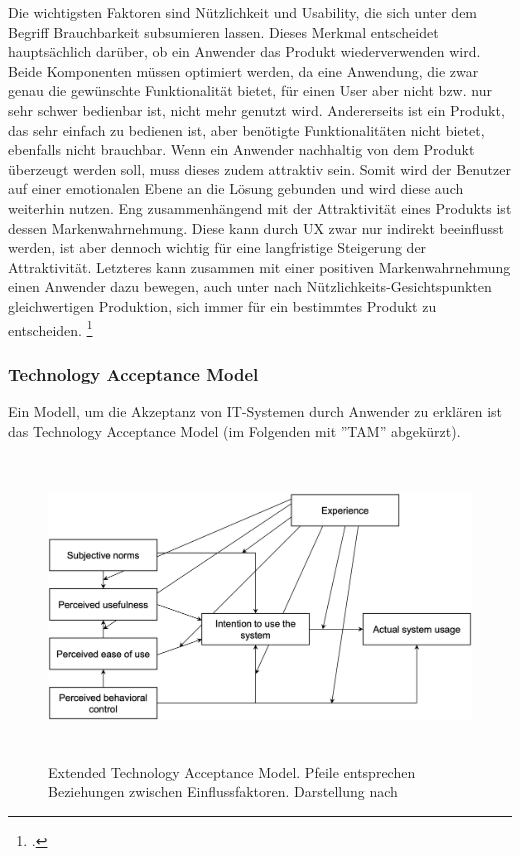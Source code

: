Die wichtigsten Faktoren sind Nützlichkeit und Usability, die sich unter dem Begriff Brauchbarkeit subsumieren lassen. Dieses Merkmal entscheidet hauptsächlich darüber, ob ein Anwender das Produkt wiederverwenden wird. Beide Komponenten müssen optimiert werden, da eine Anwendung, die zwar genau die gewünschte Funktionalität bietet, für einen User aber nicht bzw. nur sehr schwer bedienbar ist, nicht mehr genutzt wird. Andererseits ist ein Produkt, das sehr einfach zu bedienen ist, aber benötigte Funktionalitäten nicht bietet, ebenfalls nicht brauchbar. Wenn ein Anwender nachhaltig von dem Produkt überzeugt werden soll, muss dieses zudem attraktiv sein. Somit wird der Benutzer auf einer emotionalen Ebene an die Lösung gebunden und wird diese auch weiterhin nutzen. Eng zusammenhängend mit der Attraktivität eines Produkts ist dessen Markenwahrnehmung. Diese kann durch UX zwar nur indirekt beeinflusst werden, ist aber dennoch wichtig für eine langfristige Steigerung der Attraktivität. Letzteres kann zusammen mit einer positiven Markenwahrnehmung einen Anwender dazu bewegen, auch unter nach Nützlichkeits-Gesichtspunkten gleichwertigen Produktion, sich immer für ein bestimmtes Produkt zu entscheiden. \footcite[Vgl.][S. 51f]{theorie_beyer_user_experience_mit_sap_2020}

\subsubsection{Technology Acceptance Model}

Ein Modell, um die Akzeptanz von IT-Systemen durch Anwender zu erklären ist das Technology Acceptance Model (im Folgenden mit ''TAM'' abgekürzt).

\begin{figure}[H]
    \centering
    \includegraphics[height=8.02cm]{Bilder/User-Experience_ETAM.png}
    \caption[Extended Technology Acceptance Model]{Extended Technology Acceptance Model. Pfeile entsprechen Beziehungen zwischen Einflussfaktoren. Darstellung nach \cite[][]{theorie_kohnke_extended_tam_2023}}
    \label{fig:User-Experience_ETAM}
\end{figure}

